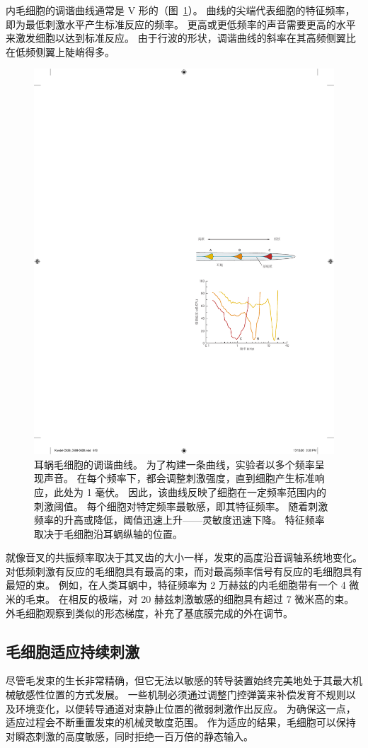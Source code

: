内毛细胞的调谐曲线通常是 V 形的（图~\ref{fig:26_11}）。
曲线的尖端代表细胞的特征频率，即为最低刺激水平产生标准反应的频率。
更高或更低频率的声音需要更高的水平来激发细胞以达到标准反应。
由于行波的形状，调谐曲线的斜率在其高频侧翼比在低频侧翼上陡峭得多。


\begin{figure}[htbp]
	\centering
	\includegraphics[width=0.55\linewidth]{chap26/fig_26_11}
	\caption{耳蜗毛细胞的调谐曲线。
		为了构建一条曲线，实验者以多个频率呈现声音。
		在每个频率下，都会调整刺激强度，直到细胞产生标准响应，此处为 1 毫伏。
		因此，该曲线反映了细胞在一定频率范围内的刺激阈值。
		每个细胞对特定频率最敏感，即其特征频率。
		随着刺激频率的升高或降低，阈值迅速上升——灵敏度迅速下降。
		特征频率取决于毛细胞沿耳蜗纵轴的位置。}
	\label{fig:26_11}
\end{figure}


就像音叉的共振频率取决于其叉齿的大小一样，发束的高度沿音调轴系统地变化。
对低频刺激有反应的毛细胞具有最高的束，而对最高频率信号有反应的毛细胞具有最短的束。
例如，在人类耳蜗中，特征频率为 2 万赫兹的内毛细胞带有一个 4 微米的毛束。
在相反的极端，对 20 赫兹刺激敏感的细胞具有超过 7 微米高的束。
外毛细胞观察到类似的形态梯度，补充了基底膜完成的外在调节。



\subsection{毛细胞适应持续刺激}

尽管毛发束的生长非常精确，但它无法以敏感的转导装置始终完美地处于其最大机械敏感性位置的方式发展。
一些机制必须通过调整门控弹簧来补偿发育不规则以及环境变化，以便转导通道对束静止位置的微弱刺激作出反应。
为确保这一点，适应过程会不断重置发束的机械灵敏度范围。
作为适应的结果，毛细胞可以保持对瞬态刺激的高度敏感，同时拒绝一百万倍的静态输入。


